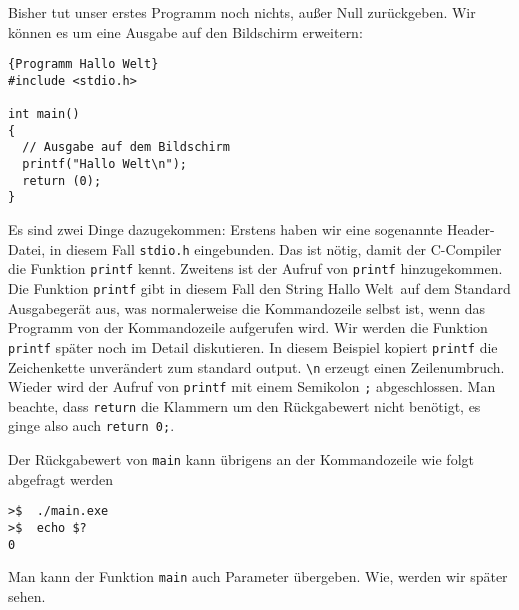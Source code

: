 Bisher tut unser erstes Programm noch nichts, außer Null zurückgeben. 
Wir können es um eine Ausgabe auf den Bildschirm erweitern:
\begin{lstlisting}{Programm Hallo Welt}
#include <stdio.h>

int main()
{
  // Ausgabe auf dem Bildschirm
  printf("Hallo Welt\n");
  return (0);
}
\end{lstlisting}
Es sind zwei Dinge dazugekommen:
Erstens haben wir eine sogenannte Header-Datei, in diesem Fall \texttt{stdio.h} eingebunden.
Das ist nötig, damit der C-Compiler die Funktion \texttt{printf} kennt.
Zweitens ist der Aufruf von \texttt{printf} hinzugekommen.
Die Funktion \texttt{printf} gibt in diesem Fall den String \glqq Hallo Welt\grqq\ auf dem Standard Ausgabegerät aus, was normalerweise die Kommandozeile selbst ist, wenn das Programm von der Kommandozeile aufgerufen wird. 
Wir werden die Funktion \texttt{printf} später noch im Detail diskutieren.
In diesem Beispiel kopiert \texttt{printf} die Zeichenkette unverändert zum standard output.
\verb|\n| erzeugt einen Zeilenumbruch.
Wieder wird der Aufruf von \texttt{printf} mit einem Semikolon \texttt{;} abgeschlossen.
Man beachte, dass \texttt{return} die Klammern um den Rückgabewert nicht benötigt, es ginge also auch \texttt{return 0;}.

Der Rückgabewert von \texttt{main} kann übrigens an der Kommandozeile wie folgt abgefragt werden

\vspace*{0.5cm}
\begin{verbatim}
>$  ./main.exe
>$  echo $?
0
\end{verbatim}
\vspace*{0.5cm}

Man kann der Funktion \texttt{main} auch Parameter übergeben.
Wie, werden wir später sehen.
